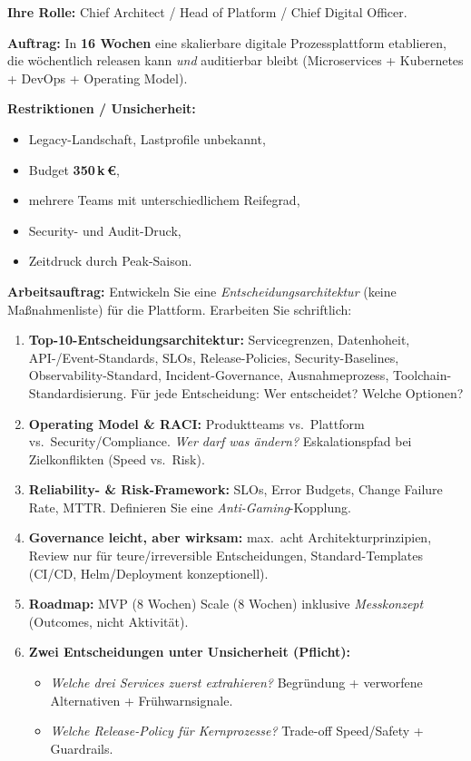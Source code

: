 \documentclass[11pt,a4paper,oneside]{article}
\begin{document}
\begin{infobox}
\textbf{Ihre Rolle:} Chief Architect / Head of Platform / Chief Digital Officer.

\smallskip
\textbf{Auftrag:} In \textbf{16 Wochen} eine skalierbare digitale Prozessplattform etablieren, die w\"ochentlich releasen kann \emph{und} auditierbar bleibt (Microservices + Kubernetes + DevOps + Operating Model).

\smallskip
\textbf{Restriktionen / Unsicherheit:}
\begin{itemize}
  \item Legacy-Landschaft, Lastprofile unbekannt,
  \item Budget \textbf{350\,k\,\euro{}},
  \item mehrere Teams mit unterschiedlichem Reifegrad,
  \item Security- und Audit-Druck,
  \item Zeitdruck durch Peak-Saison.
\end{itemize}
\end{infobox}

\noindent\textbf{Arbeitsauftrag:} Entwickeln Sie eine \emph{Entscheidungsarchitektur} (keine Ma{\ss}nahmenliste) f\"ur die Plattform. Erarbeiten Sie schriftlich:

\begin{enumerate}
  \item \textbf{Top-10-Entscheidungsarchitektur:} Servicegrenzen, Datenhoheit, API-/Event-Standards, SLOs, Release-Policies, Security-Baselines, Observability-Standard, Incident-Governance, Ausnahmeprozess, Toolchain-Standardisierung. F\"ur jede Entscheidung: Wer entscheidet? Welche Optionen?
  \item \textbf{Operating Model \& RACI:} Produktteams vs.\ Plattform vs.\ Security/Compliance. \emph{Wer darf was \"andern?} Eskalationspfad bei Zielkonflikten (Speed vs.\ Risk).
  \item \textbf{Reliability- \& Risk-Framework:} SLOs, Error Budgets, Change Failure Rate, MTTR. Definieren Sie eine \emph{Anti-Gaming}-Kopplung.
  \item \textbf{Governance leicht, aber wirksam:} max.\ acht Architekturprinzipien, Review nur f\"ur teure/irreversible Entscheidungen, Standard-Templates (CI/CD, Helm/Deployment \textendash{} konzeptionell).
  \item \textbf{Roadmap:} MVP (8 Wochen) \textrightarrow{} Scale (8 Wochen) inklusive \emph{Messkonzept} (Outcomes, nicht Aktivit\"at).
  \item \textbf{Zwei Entscheidungen unter Unsicherheit (Pflicht):}
    \begin{itemize}
      \item \emph{Welche drei Services zuerst extrahieren?} Begr\"undung + verworfene Alternativen + Fr\"uhwarnsignale.
      \item \emph{Welche Release-Policy f\"ur Kernprozesse?} Trade-off Speed/Safety + Guardrails.
    \end{itemize}
\end{enumerate}
\end{document}
